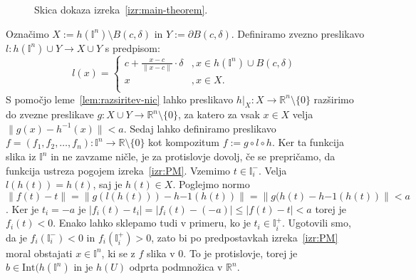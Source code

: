 \documentclass[mat1]{fmfdelo}
\newcommand{\R}{\mathbb R}
\newcommand{\I}{\mathbb I}
\newcommand{\0}{\underline{0}}
\newcommand{\Int}{\text{Int}}
\begin{document}
\begin{dokaz}
\begin{figure}[h!]
	\caption{Skica dokaza izreka~\ref{izr:main-theorem}.}
\end{figure}

Označimo $X := h(\I^n) \setminus B(c, \delta)$ in $Y := \partial B(c, \delta)$. Definiramo zvezno preslikavo $l : h(\I^n) \cup Y \to X \cup Y$ s predpisom:
\[  l(x) = \left\{
\begin{array}{ll}
	c + \frac{x - c}{\| x - c \|} \cdot \delta &, x \in h(\I^n) \cup B(c, \delta) \\
	x &, x \in X. \\
\end{array} 
\right. \]
S pomočjo leme~\ref{lem:razsiritev-nic} lahko preslikavo $h|_X : X \to \R^n \setminus \{ 0 \}$ razširimo do zvezne preslikave $g : X \cup Y \to \R^n \setminus \{ 0 \}$, za katero za vsak $x \in X$ velja $\| g(x) - h^{-1}(x) \| < a$.
Sedaj lahko definiramo preslikavo $f = (f_1, f_2, \dots, f_n) : \I^n \to \R \setminus \{ 0 \}$ kot kompozitum $f := g \circ l \circ h$. Ker ta funkcija slika iz $\I^n$ in ne zavzame ničle, je za protislovje dovolj, če se prepričamo, da funkcija ustreza pogojem izreka~\ref{izr:PM}. Vzemimo $t \in \I_i^-$. Velja $l(h(t)) = h(t)$, saj je $h(t) \in X$. Poglejmo normo $\| f(t) - t \| = \| g(l(h(t))) - h{-1}(h(t)) \| = \| g(h(t) - h{-1}(h(t)) \| < a$. Ker je $t_i = - a$ je $| f_i (t) - t_i | = | f_i (t) - ( - a) | \leq | f (t) - t | < a$ torej je $f_i(t) < 0$. Enako lahko sklepamo tudi v primeru, ko je $t_i \in \I_i^+$. Ugotovili smo, da je  $f_i(\I_i^-) < 0$ in $f_i(\I_i^+) > 0$, zato bi po predpostavkah izreka~\ref{izr:PM} moral obstajati $x \in \I^n$, ki se z $f$ slika v $0$. To je protislovje, torej je $b \in \Int (h(\I^n)$ in je $h(U)$ odprta podmnožica v $\R^n$.
\end{dokaz}
\end{document}

